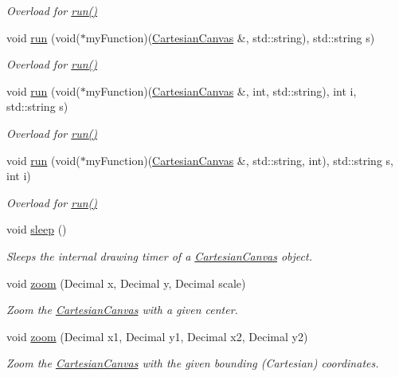 \begin{DoxyCompactItemize}
\begin{DoxyCompactList}\small\item\em Overload for \hyperlink{classtsgl_1_1_cartesian_canvas_a63a948af53582b713957b872a765dcdb}{run()} \end{DoxyCompactList}\item 
void \hyperlink{classtsgl_1_1_cartesian_canvas_a7d76ab9f68d8ce7f76b6be20305a5e95}{run} (void($\ast$my\-Function)(\hyperlink{classtsgl_1_1_cartesian_canvas}{Cartesian\-Canvas} \&, std\-::string), std\-::string s)
\begin{DoxyCompactList}\small\item\em Overload for \hyperlink{classtsgl_1_1_cartesian_canvas_a63a948af53582b713957b872a765dcdb}{run()} \end{DoxyCompactList}\item 
void \hyperlink{classtsgl_1_1_cartesian_canvas_ab0bce76883df5ae48e368a7b7835aefd}{run} (void($\ast$my\-Function)(\hyperlink{classtsgl_1_1_cartesian_canvas}{Cartesian\-Canvas} \&, int, std\-::string), int i, std\-::string s)
\begin{DoxyCompactList}\small\item\em Overload for \hyperlink{classtsgl_1_1_cartesian_canvas_a63a948af53582b713957b872a765dcdb}{run()} \end{DoxyCompactList}\item 
void \hyperlink{classtsgl_1_1_cartesian_canvas_abf52fc46a6fdca1410db6feb3c67a3cd}{run} (void($\ast$my\-Function)(\hyperlink{classtsgl_1_1_cartesian_canvas}{Cartesian\-Canvas} \&, std\-::string, int), std\-::string s, int i)
\begin{DoxyCompactList}\small\item\em Overload for \hyperlink{classtsgl_1_1_cartesian_canvas_a63a948af53582b713957b872a765dcdb}{run()} \end{DoxyCompactList}\item 
void \hyperlink{classtsgl_1_1_cartesian_canvas_a3ae99570b9a5f68f4ccf31593867edb0}{sleep} ()
\begin{DoxyCompactList}\small\item\em Sleeps the internal drawing timer of a \hyperlink{classtsgl_1_1_cartesian_canvas}{Cartesian\-Canvas} object. \end{DoxyCompactList}\item 
void \hyperlink{classtsgl_1_1_cartesian_canvas_a69a378f61868c4c880889c33ec33c992}{zoom} (Decimal x, Decimal y, Decimal scale)
\begin{DoxyCompactList}\small\item\em Zoom the \hyperlink{classtsgl_1_1_cartesian_canvas}{Cartesian\-Canvas} with a given center. \end{DoxyCompactList}\item 
void \hyperlink{classtsgl_1_1_cartesian_canvas_adb1e999087c0ec7e4405d8ebd3ca9760}{zoom} (Decimal x1, Decimal y1, Decimal x2, Decimal y2)
\begin{DoxyCompactList}\small\item\em Zoom the \hyperlink{classtsgl_1_1_cartesian_canvas}{Cartesian\-Canvas} with the given bounding (Cartesian) coordinates. \end{DoxyCompactList}\end{DoxyCompactItemize}
